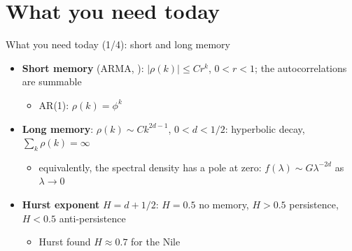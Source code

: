 \section{What you need today}

\begin{frame}{What you need today (1/4): short and long memory}
\itemsize{\small}
\begin{itemize}
    \item \textbf{Short memory} (ARMA, ): $|\rho(k)| \le Cr^k$, $0 < r < 1$; the autocorrelations are summable
    \begin{itemize}
        \item AR(1): $\rho(k) = \phi^k$
    \end{itemize}
    \item \textbf{Long memory}: $\rho(k) \sim Ck^{2d-1}$, $0 < d < 1/2$: hyperbolic decay, $\sum_k\rho(k) = \infty$
    \begin{itemize}
        \item equivalently, the spectral density has a pole at zero: $f(\lambda) \sim G\lambda^{-2d}$ as $\lambda \to 0$
    \end{itemize}
    \item \textbf{Hurst exponent} $H = d + 1/2$: $H = 0.5$ no memory, $H > 0.5$ persistence, $H < 0.5$ anti-persistence
    \begin{itemize}
        \item Hurst found $H \approx 0.7$ for the Nile 
    \end{itemize}
\end{itemize}
\end{frame}

